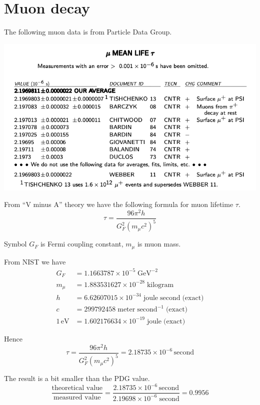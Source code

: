\documentclass[12pt]{article}
\begin{document}
\section*{Muon decay}
The following muon data is from Particle Data Group.

\begin{center}
\includegraphics[scale=0.5]{muon-mean-life.png}
\end{center}

From ``V minus A'' theory we have the following formula for muon lifetime $\tau$.
\begin{equation*}
\tau=\frac{96\pi^2h}{G_F^2\left(m_\mu c^2\right)^5}
\end{equation*}

Symbol $G_F$ is Fermi coupling constant, $m_\mu$ is muon mass.

\bigskip
From NIST we have
\begin{align*}
G_F&=1.1663787\times10^{-5}\;\text{GeV}^{-2}
\\
m_\mu&=1.883531627\times10^{-28}\;\text{kilogram}
\\
h&=6.62607015\times10^{-34}\;\text{joule}\;\text{second}\;\text{(exact)}
\\
c&=299792458\;\text{meter}\;\text{second}^{-1}\;\text{(exact)}
\\
1\,\text{eV}&=1.602176634\times10^{-19}\;\text{joule}\;\text{(exact)}
\end{align*}

Hence
\begin{equation*}
\tau=\frac{96\pi^2h}{G_F^2\left(m_\mu c^2\right)^5}
=2.18735\times10^{-6}\,\text{second}
\end{equation*}

The result is a bit smaller than the PDG value.
\begin{equation*}
\frac{\text{theoretical value}}{\text{measured value}}
=\frac{2.18735\times10^{-6}\,\text{second}}{2.19698\times10^{-6}\;\text{second}}=0.9956
\end{equation*}
\end{document}
